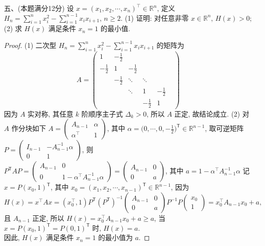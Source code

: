 \documentclass[11pt,twoside]{article} %
\begin{document}
\newpage
五、(本题满分12分)\;
设 $x=(x_1,x_2,\cdots,x_n)^{\intercal}\in\mathbb{R}^n$, 定义 $H_n=\textstyle\sum\limits_{i=1}^{n}x_i^2-\sum\limits_{i=1}^{n-1}x_ix_{i+1},\,n\geqslant2$.\newline
(1) 证明: 对任意非零 $x\in\mathbb{R}^n,\,H(x)>0$;\\
(2) 求 $H(x)$ 满足条件 $x_n=1$ 的最小值.
\begin{proof} 
(1) 二次型 $H_n=\textstyle\sum\limits_{i=1}^{n}x_i^2-\sum\limits_{i=1}^{n-1}x_ix_{i+1}$  的矩阵为
\[A=\begin{pmatrix}
1     &-\tfrac{1}{2}&            &            &            &\\
-\tfrac{1}{2}&      1     &-\tfrac{1}{2}&            &            &\\
&-\tfrac{1}{2}&   \ddots   &  \ddots    &            &\\
&            &   \ddots   &     1      &-\tfrac{1}{2}&\\
&            &            &-\tfrac{1}{2}&     1      &
\end{pmatrix}\tag{3分}\]
因为 $A$ 实对称, 其任意 $k$ 阶顺序主子式 $\Delta_k>0$, 所以 $A$ 正定, 故结论成立.
(2) 对 $A$ 作分块如下 $A=\begin{pmatrix}
A_{n-1} &\alpha\\ \alpha^{\intercal}&1
\end{pmatrix}$, 其中 $\alpha=\Big(0,\cdots,0,-\frac{1}{2}\Big)^{\mathsf{T}}\in\mathbb{R}^{n-1}$, 取可逆矩阵\\
$P=\begin{pmatrix}
I_{n-1}&-A_{n-1}^{-1}\alpha\\0&1
\end{pmatrix}$, 则 $P^{\mathsf{T}}AP=\begin{pmatrix}
A_{n-1} &0\\0&1-\alpha^{\intercal}A_{n-1}^{-1}\alpha
\end{pmatrix}=\begin{pmatrix}
A_{n-1} &0\\ 0&a
\end{pmatrix}$, 其中 $a=1-\alpha^{\intercal}A_{n-1}^{-1}\alpha$
记 $x=P(x_0,1)^{\mathsf{T}}$, 其中 $x_0=(x_1,x_2,\cdots,x_{n-1})^{\mathsf{T}}\in\mathbb{R}^{n-1}$, 因为
\[H(x)=x^{\intercal}Ax=(x_0^{\intercal},1)P^{\mathsf{T}}(P^{\mathsf{T}})^{-1}\begin{pmatrix}
A_{n-1} &0\\ 0&a
\end{pmatrix}P^{-1}P\begin{pmatrix}
x_0\\1
\end{pmatrix}=x_0^\intercal A_{n-1}x_0+a,\]
且 $A_{n-1}$ 正定, 所以 $H(x)=x_0^\intercal A_{n-1}x_0+a\geqslant a$, 当 $x=P(x_0,1)^{\mathsf{T}}=P(0,1)^{\mathsf{T}}$ 时, $H(x)=a$. \\
因此, $H(x)$ 满足条件 $x_n=1$ 的最小值为 $a$. 
\qedhere\end{proof}
\end{document}
